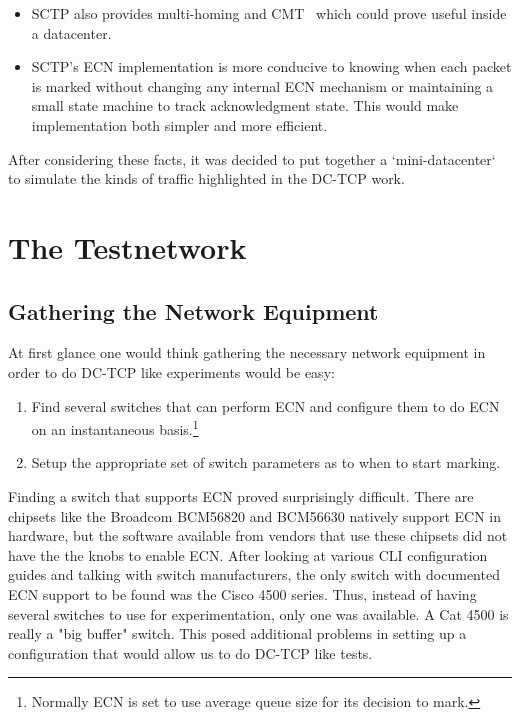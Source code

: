 \documentclass[12pt]{article}
\begin{document}
\begin{enumerate}
\begin{itemize}
\item SCTP also provides multi-homing and CMT~\cite{jana} which could prove useful inside a datacenter.

\item SCTP's ECN implementation is more conducive to knowing when each packet is marked without
      changing any internal ECN mechanism or maintaining a small state machine to track acknowledgment state. 
      This would make implementation both simpler and more efficient.
\end{itemize}

\end{enumerate}

After considering these facts, it was decided to put together a `mini-datacenter`
to simulate the kinds of traffic highlighted in the DC-TCP work.

\section{The Testnetwork}
\subsection{Gathering the Network Equipment}

At first glance one would think gathering the necessary network equipment in order to do DC-TCP like
experiments would be easy:
\begin{enumerate}
\item Find several switches that can perform ECN and configure them
to do ECN on an instantaneous basis.\footnote{Normally ECN is set to use average queue size
for its decision to mark.}

\item Setup the appropriate set of switch parameters as to when to start
marking. 

\end{enumerate}

Finding a switch that supports ECN proved surprisingly difficult.  
There are chipsets like the Broadcom BCM56820 and BCM56630 natively support 
ECN in hardware,  but the software available from vendors that use
these chipsets did not have the the knobs to enable ECN. After looking at various CLI
configuration guides and talking with switch manufacturers, the only switch with documented
ECN support to be found was the Cisco 4500 series. Thus, instead of having several switches
to use for experimentation, only one was available. A Cat 4500 is really a "big buffer"
switch. This posed additional problems in setting up a configuration
that would allow us to do DC-TCP like tests.
\end{document}
